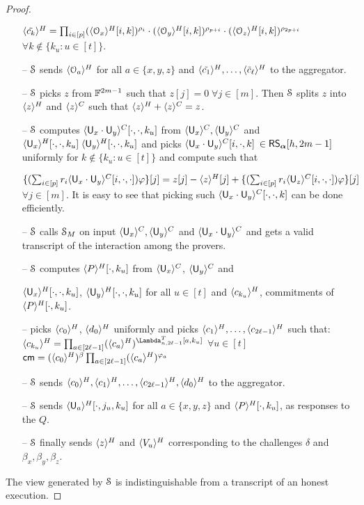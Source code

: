 \begin{proof}
\begin{itemize}
		$\langle{\tilde{c_k}}\rangle^H = \prod_{i\in[p]} (\langle{\mathcal{O}_x}\rangle^H[i,k])^{\rho_i}\cdot(\langle{\mathcal{O}_y}\rangle^H[i,k])^{\rho_{p+i}}\cdot(\langle{\mathcal{O}_z}\rangle^H[i,k])^{\rho_{2p+i}}$ $\forall k\notin\{k_u:u\in[t]\}$.
		\item[--] $\mathcal{S}$ sends $\langle{\mathcal{O}_a}\rangle^H$ for all $a\in\{x,y,z\}$ and $\langle{\tilde{c_1}}\rangle^H, \ldots, \langle{\tilde{c}_{\ell}}\rangle^H$ to the aggregator.
		\item[--] $\mathcal{S}$ picks $z$ from $\mathbb{F}^{2m-1}$ such that $z[j]=0\; \forall j\in[m]$. Then $\mathcal{S}$ splits $z$ into $\langle{z}\rangle^H$ and $\langle{z}\rangle^C$ such that $\langle{z}\rangle^H+\langle{z}\rangle^C = z$.
		\item[--] $\mathcal{S}$ computes $\langle{\mathsf{U}_x\cdot\mathsf{U}_y}\rangle^C[\cdot,\cdot,k_u]$ from $\langle{\mathsf{U}_x}\rangle^C, \langle{\mathsf{U}_y}\rangle^C$ and $\langle{\mathsf{U}_x}\rangle^H[\cdot,\cdot,k_u]\; \langle{\mathsf{U}_y}\rangle^H[\cdot,\cdot,k_u]$ and picks $\langle{\mathsf{U}_x\cdot\mathsf{U}_y}\rangle^C[i,\cdot,k]$ $\in \mathsf{RS}_{\bm{\alpha}}[h,2m-1]$ uniformly for $k\notin \{k_u:u\in[t]\}$ and compute such that 
		
		$\{(\sum_{i\in[p]}r_i\langle{\mathsf{U}_x\cdot\mathsf{U}_y}\rangle^C[i,\cdot,\cdot])\varphi\}[j]=z[j] -\langle{z}\rangle^H[j]+\{(\sum_{i\in[p]}r_i\langle{\mathsf{U}_z}\rangle^C[i,\cdot,\cdot])\varphi\}[j]$ $\forall j\in[m]$.
		It is easy to see that picking such $\langle{\mathsf{U}_x\cdot\mathsf{U}_y}\rangle^C[\cdot,\cdot,k]$ can be done efficiently.
		\item[--] $\mathcal{S}$ calls $\mathcal{S}_{M}$ on input $\langle{\mathsf{U}_x}\rangle^C, \langle{\mathsf{U}_y}\rangle^C$ and $\langle{\mathsf{U}_x\cdot\mathsf{U}_y}\rangle^C$ and gets a valid transcript of the interaction among the provers.
		\item[--] $\mathcal{S}$ computes $\langle{P}\rangle^H[\cdot,k_u]$ from $\langle{\mathsf{U}_x}\rangle^C$, $\langle{\mathsf{U}_y}\rangle^C$ and 
		
		\noindent$\langle{\mathsf{U}_x}\rangle^H[\cdot,\cdot,k_u]$, $\langle{\mathsf{U}_y}\rangle^H[\cdot,\cdot,k_u]$ for all $u\in[t]$ and $\langle{c_{k_u}}\rangle^H$, commitments of $\langle{P}\rangle^H[\cdot,k_u]$.
		
		\item[--] picks $\langle{c_0}\rangle^H$, $\langle{d_0}\rangle^H$ uniformly and picks
		$\langle{c_1}\rangle^H, \ldots, \langle{c_{2\ell-1}}\rangle^H$ such that:\\
		$\honshr{c_{k_u}} = \prod_{a\in[2\ell-1]}(\honshr{c_a})^{\Lambda_{n,2\ell-1}^T[a,k_u]}$ $\forall u\in[t]$\\
		$\mathsf{cm} = (\langle{c_0}\rangle^H)^{\beta}\prod_{a\in[2\ell-1]}(\langle{c_a}\rangle^H)^{\varphi_a}$
		\item[--] $\mathcal{S}$ sends $\langle{c_0}\rangle^H, \langle{c_1}\rangle^H, \ldots, \langle{c_{2\ell-1}}\rangle^H, \langle{d_0}\rangle^H$ to the aggregator.
		\item[--] $\mathcal{S}$ sends $\langle{\mathsf{U}_a}\rangle^H[\cdot,j_u,k_u]$ for all $a\in\{x,y,z\}$ and $\langle{P}\rangle^H[\cdot,k_u]$, as responses to the $Q$.
		\item[--] $\mathcal{S}$ finally sends $\langle{z}\rangle^H$ and $\langle{V_u}\rangle^H$ corresponding to the challenges $\delta$ and $\beta_x, \beta_y, \beta_z$.
	\end{itemize}
	The view generated by $\mathcal{S}$ is indistinguishable from a transcript of an honest execution. 
\end{proof}
